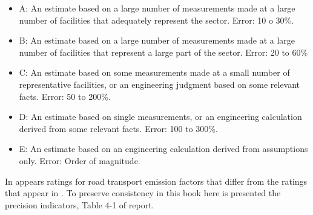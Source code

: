 \documentclass[12pt,graybox,envcountchap,sectrefs]{krantz}
\providecommand{\tightlist}{%
  \setlength{\itemsep}{0pt}\setlength{\parskip}{0pt}}
\theoremstyle{definition}
\theoremstyle{definition}
\theoremstyle{definition}
\theoremstyle{remark}
\begin{document}
\begin{itemize}
\tightlist
\item
  A: An estimate based on a large number of measurements made at a large
  number of facilities that adequately represent the sector. Error: 10 o
  30\%.
\item
  B: An estimate based on a large number of measurements made at a large
  number of facilities that represent a large part of the sector. Error:
  20 to 60\%
\item
  C: An estimate based on some measurements made at a small number of
  representative facilities, or an engineering judgment based on some
  relevant facts. Error: 50 to 200\%.
\item
  D: An estimate based on single measurements, or an engineering
  calculation derived from some relevant facts. Error: 100 to 300\%.
\item
  E: An estimate based on an engineering calculation derived from
  assumptions only. Error: Order of magnitude.
\end{itemize}

In \citet{guia} appears ratings for road transport emission factors that
differ from the ratings that appear in \citet{NtziachristosSamaras2016}.
To preserve consistency in this book here is presented the precision
indicators, Table 4-1 of \citet{NtziachristosSamaras2016} report.
\end{document}
